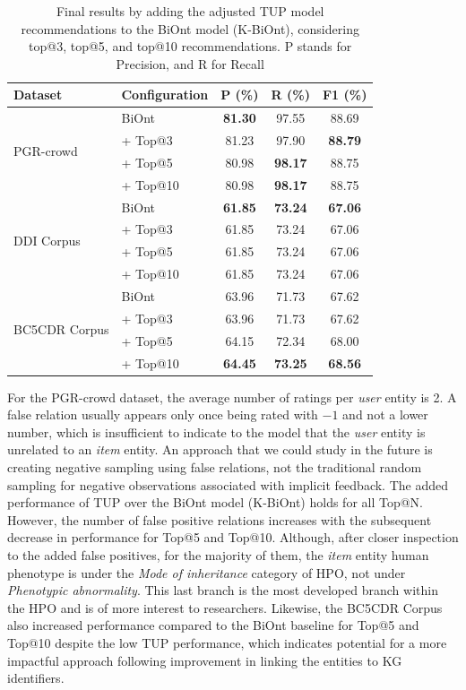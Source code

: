 \begin{table}[h]
\centering
  \caption[K-BiOnt Final Results]{Final results by adding the adjusted TUP model recommendations to the BiOnt model (K-BiOnt), considering top@3, top@5, and top@10 recommendations. P stands for Precision, and R for Recall}
  \label{tab:final_results}
  \begin{tabular}{llccc}
    \hline
    Dataset & Configuration & P (\%) & R (\%) & F1 (\%) \\
    
    \hline
    \multirow{4}{*}{PGR-crowd} & BiOnt & \textbf{81.30} & 97.55 & 88.69 \\
    & + Top@3 & 81.23 & 97.90 & \textbf{88.79} \\
    & + Top@5 & 80.98 & \textbf{98.17} & 88.75 \\
    & + Top@10 & 80.98 & \textbf{98.17} & 88.75 \\
    
    \hline
    \multirow{4}{*}{DDI Corpus} & BiOnt & \textbf{61.85} & \textbf{73.24} & \textbf{67.06} \\
    & + Top@3 & 61.85 & 73.24 & 67.06 \\
    & + Top@5 & 61.85 & 73.24 & 67.06 \\
    & + Top@10 & 61.85 & 73.24 & 67.06 \\
    
    \hline
    \multirow{4}{*}{BC5CDR Corpus} & BiOnt & 63.96 & 71.73 & 67.62 \\
    & + Top@3 & 63.96 & 71.73 & 67.62  \\
    & + Top@5 & 64.15 & 72.34 & 68.00  \\
    & + Top@10 & \textbf{64.45} & \textbf{73.25} & \textbf{68.56} \\


    \hline
  \end{tabular}
\end{table}


For the PGR-crowd dataset, the average number of ratings per \textit{user} entity is 2. A false relation usually appears only once being rated with $-1$ and not a lower number, which is insufficient to indicate to the model that the \textit{user} entity is unrelated to an \textit{item} entity. An approach that we could study in the future is creating negative sampling using false relations, not the traditional random sampling for negative observations associated with implicit feedback. The added performance of TUP over the BiOnt model (K-BiOnt) holds for all Top@N. However, the number of false positive relations increases with the subsequent decrease in performance for Top@5 and Top@10. Although, after closer inspection to the added false positives, for the majority of them, the \textit{item} entity human phenotype is under the \textit{Mode of inheritance} category of HPO, not under \textit{Phenotypic abnormality}. This last branch is the most developed branch within the HPO and is of more interest to researchers. Likewise, the BC5CDR Corpus also increased performance compared to the BiOnt baseline for Top@5 and Top@10 despite the low TUP performance, which indicates potential for a more impactful approach following improvement in linking the entities to KG identifiers. 

